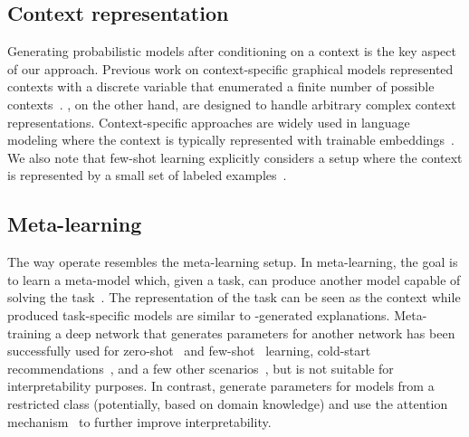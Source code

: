\documentclass[twoside,11pt]{article}
\begin{document}
\subsection{Context representation}
Generating probabilistic models after conditioning on a context is the key aspect of our approach.
Previous work on context-specific graphical models represented contexts with a discrete variable that enumerated a finite number of possible contexts~\citep[][Ch.~5.3]{koller2009pgm}.
{\CENs}, on the other hand, are designed to handle arbitrary complex context representations.
Context-specific approaches are widely used in language modeling where the context is typically represented with trainable embeddings~\citep{rudolph2016efe}.
We also note that few-shot learning explicitly considers a setup where the context is represented by a small set of labeled examples~\citep{santoro2016meta,garnelo2018conditional}.

\subsection{Meta-learning}
The way {\CENs} operate resembles the meta-learning setup.
In meta-learning, the goal is to learn a meta-model which, given a task, can produce another model capable of solving the task~\citep{thrun1998learning}.
The representation of the task can be seen as the context while produced task-specific models are similar to {\CEN}-generated explanations.
Meta-training a deep network that generates parameters for another network has been successfully used for zero-shot~\citep{lei2015predicting,changpinyo2016synthesized} and few-shot~\citep{edwards2016towards,vinyals2016matching} learning, cold-start recommendations~\citep{vartak2017meta}, and a few other scenarios~\citep{bertinetto2016learning,de2016dynamic,ha2016hypernetworks}, but is not suitable for interpretability purposes.
In contrast, {\CENs} generate parameters for models from a restricted class (potentially, based on domain knowledge) and use the attention mechanism~\citep{xu2015show} to further improve interpretability.
\end{document}
